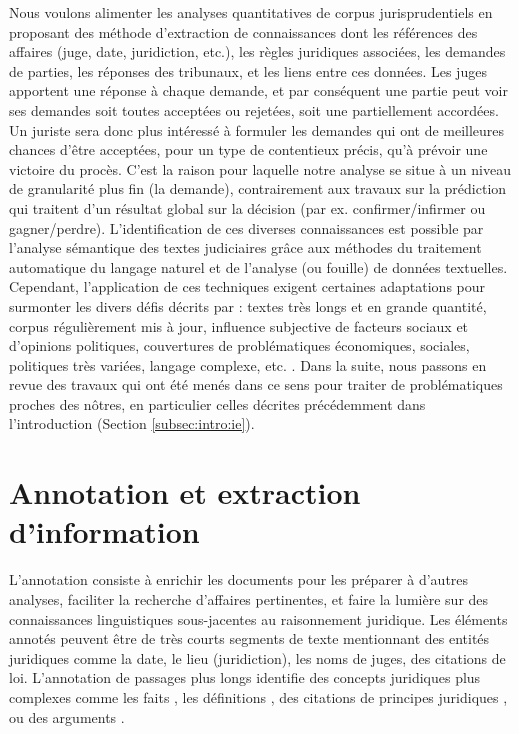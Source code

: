 Nous voulons alimenter les analyses quantitatives de corpus jurisprudentiels en proposant des méthode d'extraction de connaissances dont les références des affaires (juge, date, juridiction, etc.), les règles juridiques associées, les demandes de parties, les réponses des tribunaux, et les liens entre ces données. Les juges apportent une réponse à chaque demande, et par conséquent une partie peut voir ses demandes soit toutes acceptées ou rejetées, soit une partiellement accordées. Un juriste sera donc plus intéressé à formuler les demandes qui ont de meilleures chances d'être acceptées, pour un type de contentieux précis,  qu'à prévoir une victoire du procès. C'est la raison pour laquelle notre analyse se situe à un niveau de granularité plus fin (la demande), contrairement aux travaux sur la prédiction qui traitent d'un résultat global sur la décision (par ex. confirmer/infirmer ou gagner/perdre).  L'identification de ces diverses connaissances est possible par l'analyse sémantique des textes judiciaires grâce aux méthodes du traitement automatique du langage naturel et de l'analyse (ou fouille) de données textuelles. Cependant, l'application de ces techniques exigent certaines adaptations pour surmonter les divers défis décrits par \citet{narazenko2017legalnlpintro}: textes très longs et en grande quantité, corpus régulièrement mis à jour, influence subjective de facteurs sociaux et d'opinions politiques, couvertures de problématiques économiques, sociales, politiques très variées, langage complexe, etc. . Dans la suite, nous passons en revue des travaux qui ont été menés dans ce sens pour traiter de problématiques proches des nôtres, en particulier celles décrites précédemment dans l'introduction (Section \ref{subsec:intro:ie}). 

\section{Annotation et extraction d'information}

L'annotation consiste à enrichir les documents pour les préparer à d'autres analyses, faciliter la recherche d'affaires pertinentes, et faire la lumière sur des connaissances linguistiques sous-jacentes au raisonnement juridique. Les éléments annotés peuvent être de très courts segments de texte mentionnant des entités juridiques \citep{Waltl2016lexia, wyner2010extractlegalelts} comme la date, le lieu (juridiction), les noms de juges, des citations de loi.  L'annotation de passages plus longs identifie des concepts juridiques plus complexes comme les faits \citep{wyner2010extractlegalelts, wyner2010casefactors, Shulayeva2017recognfactprincip}, les définitions \citep{Waltl2016lexia,waltl2017legaliegerman}, des citations de principes juridiques \citep{Shulayeva2017recognfactprincip}, ou des arguments \citep{WynerMoens2010mineargument}. 

